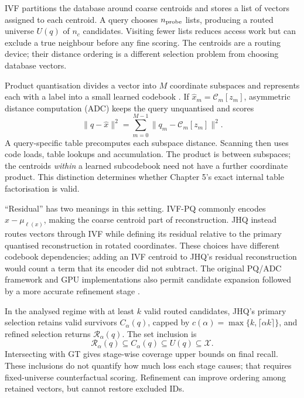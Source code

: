 IVF partitions the database around coarse centroids and stores a list of
vectors assigned to each centroid. A query chooses $n_{\rm probe}$ lists,
producing a routed universe $U(q)$ of $n_c$ candidates. Visiting fewer lists
reduces access work but can exclude a true neighbour before any fine scoring.
The centroids are a routing device; their distance ordering is a different
selection problem from choosing database vectors.

Product quantisation divides a vector into $M$ coordinate subspaces and
represents each with a label into a small learned codebook \cite{pq}.
If $\widehat x_m=\mathcal C_m[z_m]$, asymmetric distance computation (ADC)
keeps the query unquantised and scores
\begin{equation}
 \|q-\widehat x\|^2=\sum_{m=0}^{M-1}\|q_m-\mathcal C_m[z_m]\|^2.
 \label{eq:2-adc}
\end{equation}
A query-specific table precomputes each subspace distance. Scanning then
uses code loads, table lookups and accumulation. The product is between
subspaces; the centroids \emph{within} a learned subcodebook need not have a
further coordinate product. This distinction determines whether Chapter 5's
exact internal table factorisation is valid.

``Residual'' has two meanings in this setting. IVF-PQ commonly encodes
$x-\mu_{\ell(x)}$, making the coarse centroid part of reconstruction.
JHQ instead routes vectors through IVF while defining its residual relative
to the primary quantised reconstruction in rotated coordinates. These choices
have different codebook dependencies; adding an IVF centroid to JHQ's
residual reconstruction would count a term that its encoder did not subtract.
The original PQ/ADC framework and GPU implementations also permit candidate
expansion followed by a more accurate refinement stage
\cite{johnson_gpu,faiss_refine}.

In the analysed regime with at least $k$ valid routed candidates, JHQ's
primary selection retains valid survivors $C_\alpha(q)$, capped by
$c(\alpha)=\max\{k,\lceil\alpha k\rceil\}$, and refined selection returns
$\mathcal R_\alpha(q)$. The set inclusion is
\begin{equation}
 \mathcal R_\alpha(q)\subseteq C_\alpha(q)\subseteq U(q)\subseteq\mathcal X.
 \label{eq:2-cascade}
\end{equation}
Intersecting with GT gives stage-wise coverage upper bounds on final recall.
These inclusions do not quantify how much loss each stage causes; that
requires fixed-universe counterfactual scoring. Refinement can improve
ordering among retained vectors, but cannot restore excluded IDs.

